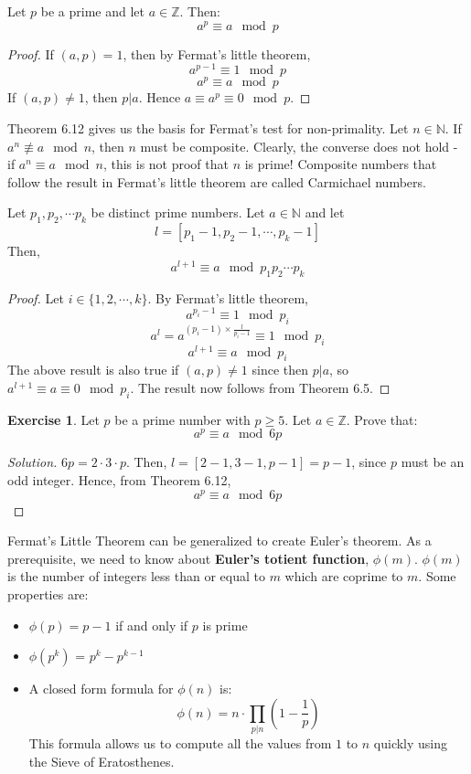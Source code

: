 \documentclass[12pt,letterpaper]{book}
\theoremstyle{definition}
\newtheorem*{exercise}{Exercise}
\newenvironment{solution}
  {\renewcommand\qedsymbol{$\blacksquare$}\begin{proof}[Solution]}
  {\end{proof}}
\newcommand{\N}{\mathbb{N}}
\newcommand{\Z}{\mathbb{Z}}
\begin{document}
\begin{theorem}
  Let $p$ be a prime and let $a \in \Z$. Then:
  \[a^p \equiv a \mod p\]
\end{theorem}
\begin{proof}
  If $(a,p) = 1$, then by Fermat's little theorem,
  \[a^{p-1} \equiv 1 \mod p\]
  \[a^p \equiv a \mod p\]
  If $(a,p) \neq 1$, then $p|a$. Hence $a \equiv a^p \equiv 0 \mod p$.
\end{proof}

Theorem 6.12 gives us the basis for Fermat's test for non-primality. Let $n \in \N$. If $a^n \not \equiv a \mod n$, then $n$ must be composite. Clearly, the converse does not hold - if $a^n \equiv a \mod n$, this is not proof that $n$ is prime! Composite numbers that follow the result in Fermat's little theorem are called Carmichael numbers.

\begin{theorem}
  Let $p_1, p_2, \cdots p_k$ be distinct prime numbers. Let $a \in \N$ and let
  \[l = [p_1-1,p_2-1, \cdots, p_k-1]\]
  Then,
  \[a^{l+1} \equiv a \mod p_1p_2 \cdots p_k\]
\end{theorem}
\begin{proof}
  Let $i \in \{1,2,\cdots, k\}$. By Fermat's little theorem,
  \[a^{p_i-1} \equiv 1 \mod p_i\]
  \[a^l = a^{(p_i-1) \times \frac{l}{p_i-1}} \equiv 1 \mod p_i\]
  \[a^{l+1} \equiv a \mod p_i\]
  The above result is also true if $(a,p) \neq 1$ since then $p|a$, so $a^{l+1} \equiv a \equiv 0 \mod p_i$. The result now follows from Theorem 6.5.
\end{proof}

\begin{exercise}
  Let $p$ be a prime number with $p \geq 5$. Let $a \in \Z$. Prove that:
  \[a^p \equiv a \mod 6p\]
\end{exercise}
\begin{solution}
  $6p = 2 \cdot 3 \cdot p$. Then, $l = [2-1,3-1, p-1] = p-1$, since $p$ must be an odd integer. Hence, from Theorem 6.12,
  \[a^p \equiv a \mod 6p\]
\end{solution}

Fermat's Little Theorem can be generalized to create Euler's theorem. As a prerequisite, we need to know about \textbf{Euler's totient function}, $\phi(m)$. $\phi(m)$ is the number of integers less than or equal to $m$ which are coprime to $m$. Some properties are:

\begin{itemize}
  \item $\phi(p) = p-1$ if and only if $p$ is prime
  \item $\phi(p^k)$ = $p^k - p^{k-1}$
  \item A closed form formula for $\phi(n)$ is:
    \[\phi(n) = n \cdot \prod_{p|n} \left (1 - \frac{1}{p} \right )\]
    This formula allows us to compute all the values from $1$ to $n$ quickly using the Sieve of Eratosthenes.
\end{itemize}
\end{document}
